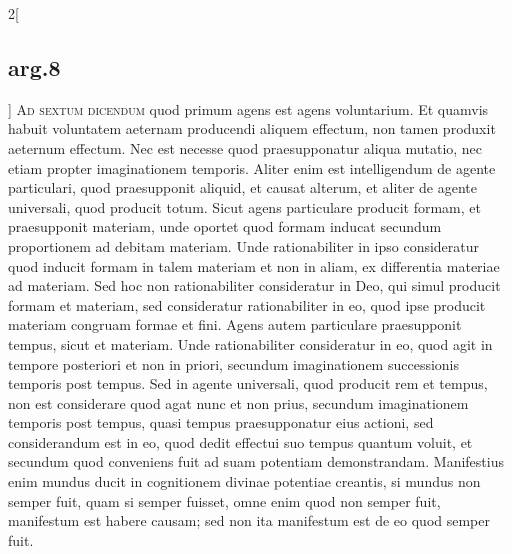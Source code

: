 \documentclass[paper=a4paper,fontsize=10pt,jafontsize=9pt,titlepage]{jlreq}
\begin{document}
\begin{paracol}{2}[\subsection{arg.8}]
{\scshape Ad sextum dicendum} quod primum agens est agens voluntarium. Et quamvis
 habuit voluntatem aeternam producendi aliquem effectum, non tamen
 produxit aeternum effectum. Nec est necesse quod praesupponatur aliqua
 mutatio, nec etiam propter imaginationem temporis. Aliter enim est
 intelligendum de agente particulari, quod praesupponit aliquid, et
 causat alterum, et aliter de agente universali, quod producit
 totum. Sicut agens particulare producit formam, et praesupponit
 materiam, unde oportet quod formam inducat secundum proportionem ad
 debitam materiam. Unde rationabiliter in ipso consideratur quod inducit
 formam in talem materiam et non in aliam, ex differentia materiae ad
 materiam. Sed hoc non rationabiliter consideratur in Deo, qui simul
 producit formam et materiam, sed consideratur rationabiliter in eo,
 quod ipse producit materiam congruam formae et fini. Agens autem
 particulare praesupponit tempus, sicut et materiam. Unde rationabiliter
 consideratur in eo, quod agit in tempore posteriori et non in priori,
 secundum imaginationem successionis temporis post tempus. Sed in agente
 universali, quod producit rem et tempus, non est considerare quod agat
 nunc et non prius, secundum imaginationem temporis post tempus, quasi
 tempus praesupponatur eius actioni, sed considerandum est in eo, quod
 dedit effectui suo tempus quantum voluit, et secundum quod conveniens
 fuit ad suam potentiam demonstrandam. Manifestius enim mundus ducit in
 cognitionem divinae potentiae creantis, si mundus non semper fuit, quam
 si semper fuisset, omne enim quod non semper fuit, manifestum est
 habere causam; sed non ita manifestum est de eo quod semper fuit.


\switchcolumn



\end{paracol}
\end{document}
